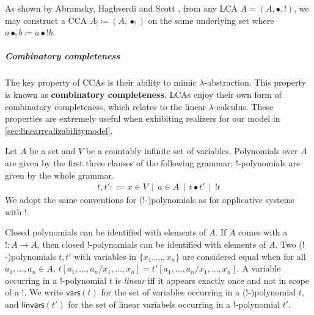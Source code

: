\documentclass[a4paper,UKenglish,cleveref,numberwithinsect, autoref, thm-restate]{lipics-v2021}
\newcommand{\B}{\mathsf{B}}
\newcommand{\I}{\mathsf{I}}
\newcommand{\C}{\mathsf{C}}
\newcommand{\W}{\mathsf{W}}
\newcommand{\K}{\mathsf{K}}
\newcommand{\D}{\mathsf{D}}
\newcommand{\F}{\mathsf{F}}
\newcommand{\LCAtoPCA}[1]{#1_!}
\begin{document}
As shown by Abramsky, Haghverdi and Scott \cite{AbramskyHaghverdiScott2002LCAs,Haghverdi2000}, from any LCA $A = (A,\bullet,!)$, we may construct a CCA $\LCAtoPCA{A} \coloneq (A,\bullet_!)$ on the same underlying set where $a\bullet_! b \coloneqq a \mathrel{\bullet} {!b}$.

\subparagraph*{Combinatory completeness}

The key property of CCAs is their ability to mimic $\lambda$-abstraction. This property is known as \textbf{combinatory completeness}. LCAs enjoy their own form of combinatory completeness, which relates to the linear $\lambda$-calculus. These properties are extremely useful when exhibiting realizers for our model in \autoref{sec:linearrealizabilitymodel}. 

Let $A$ be a set and $V$ be a countably infinite set of variables. Polynomials over $A$ are given by the first three clauses of the following grammar; $!$-polynomials are given by the whole grammar.
\begin{align*}
    t, t' ::= x\in V \,\mid\, a\in A \,\mid\, t\bullet t' \,\mid\, !t
\end{align*}
We adopt the same conventions for ($!$-)polynomials as for applicative systems with $!$. %

Closed polynomials can be identified with elements of $A$. If $A$ comes with a $!:A \rightarrow A$, then closed $!$-polynomials can be identified with elements of $A$. Two ($!$-)polynomials $t,t'$ with variables in $\{x_1,...,x_n\}$ are considered equal when for all $a_1,...,a_n\in A$, $t[a_1,...,a_n/x_1,...,x_n] = t'[a_1,...,a_n/x_1,...,x_n]$.
A variable occurring in a $!$-polynomial $t$ is \textit{linear} iff it appears exactly once and not in scope of a $!$.
We write $\mathsf{vars}(t)$ for the set of variables occurring in a ($!$-)polynomial $t$, and $\mathsf{linvars}(t')$ for the set of linear variabels occurring in a $!$-polynomial $t'$.
\end{document}
